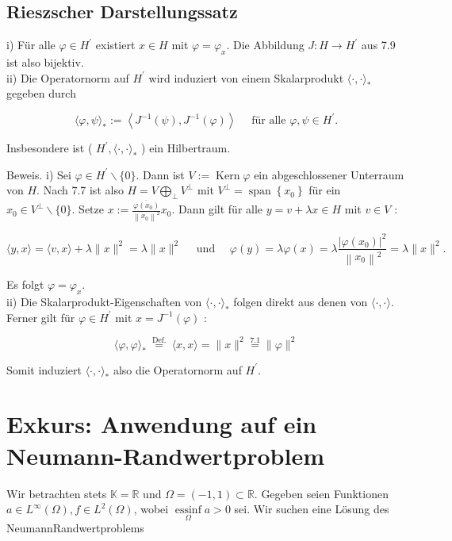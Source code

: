 \documentclass[10pt, letterpaper]{article}
\begin{document}
\subsection*{Rieszscher Darstellungssatz}
i) Für alle $\varphi \in H^{\prime}$ existiert $x \in H$ mit $\varphi=\varphi_{x}$. Die Abbildung $J: H \rightarrow H^{\prime}$ aus 7.9 ist also bijektiv.\\
ii) Die Operatornorm auf $H^{\prime}$ wird induziert von einem Skalarprodukt $\langle\cdot, \cdot\rangle_{*}$ gegeben durch

$$
\langle\varphi, \psi\rangle_{*}:=\left\langle J^{-1}(\psi), J^{-1}(\varphi)\right\rangle \quad \text { für alle } \varphi, \psi \in H^{\prime} .
$$

Insbesondere ist ( $H^{\prime},\langle\cdot, \cdot\rangle_{*}$ ) ein Hilbertraum.

Beweis. i) Sei $\varphi \in H^{\prime} \backslash\{0\}$. Dann ist $V:=\operatorname{Kern} \varphi$ ein abgeschlossener Unterraum von $H$. Nach 7.7 ist also $H=V \bigoplus_{\perp} V^{\perp}$ mit $V^{\perp}=\operatorname{span}\left\{x_{0}\right\}$ für ein $x_{0} \in V^{\perp} \backslash\{0\}$. Setze $x:=\frac{\overline{\varphi\left(x_{0}\right)}}{\left\|x_{0}\right\|^{2}} x_{0}$. Dann gilt für alle $y=v+\lambda x \in H$ mit $v \in V$ :

$$
\langle y, x\rangle=\langle v, x\rangle+\lambda\|x\|^{2}=\lambda\|x\|^{2} \quad \text { und } \quad \varphi(y)=\lambda \varphi(x)=\lambda \frac{\left|\varphi\left(x_{0}\right)\right|^{2}}{\left\|x_{0}\right\|^{2}}=\lambda\|x\|^{2} .
$$

Es folgt $\varphi=\varphi_{x}$.\\
ii) Die Skalarprodukt-Eigenschaften von $\langle\cdot, \cdot\rangle_{*}$ folgen direkt aus denen von $\langle\cdot, \cdot\rangle$. Ferner gilt für $\varphi \in H^{\prime}$ mit $x=J^{-1}(\varphi)$ :

$$
\langle\varphi, \varphi\rangle_{*} \stackrel{\text { Def. }}{=}\langle x, x\rangle=\|x\|^{2} \stackrel{\boxed{7.1}}{=}\|\varphi\|^{2}
$$

Somit induziert $\langle\cdot, \cdot\rangle_{*}$ also die Operatornorm auf $H^{\prime}$.

\section*{Exkurs: Anwendung auf ein Neumann-Randwertproblem}
Wir betrachten stets $\mathbb{K}=\mathbb{R}$ und $\Omega=(-1,1) \subset \mathbb{R}$. Gegeben seien Funktionen $a \in L^{\infty}(\Omega), f \in L^{2}(\Omega)$, wobei $\underset{\Omega}{\operatorname{essinf}} a>0$ sei. Wir suchen eine Lösung des NeumannRandwertproblems
\end{document}
